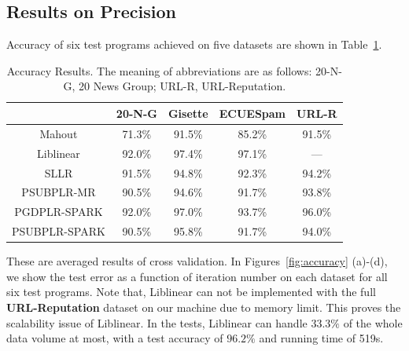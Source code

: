 \documentclass[10pt, conference, compsocconf]{IEEEtran}
\begin{document}
\subsection{Results on Precision} \label{sec:precision}
Accuracy of six test programs achieved on five datasets are shown in Table~\ref{tab:table3}.
%
\begin{table}[h]
\centering
\caption{Accuracy Results. The meaning of abbreviations are as follows: 20-N-G, 20 News Group; URL-R, URL-Reputation.}\label{tab:table3}\vspace{-0.3cm}
\begin{tabular}{|c|c|c|c|c|}
\hline
           & 20-N-G & Gisette & ECUESpam & URL-R \\
\hline
Mahout     & 71.3\% & 91.5\% & 85.2\% & 91.5\% \\
\hline
Liblinear  & 92.0\% & 97.4\% & 97.1\% & --- \\
\hline
SLLR       & 91.5\% & 94.8\% & 92.3\% & 94.2\% \\
\hline
PSUBPLR-MR & 90.5\% & 94.6\% & 91.7\% & 93.8\% \\
\hline
PGDPLR-SPARK & 92.0\% & 97.0\% & 93.7\% & 96.0\% \\
\hline
PSUBPLR-SPARK & 90.5\% & 95.8\% & 91.7\% & 94.0\% \\
\hline
\end{tabular}
\end{table}
%
These are averaged results of cross validation.
In Figures~\ref{fig:accuracy} (a)-(d), we show the test error as a function of iteration number on each dataset for all six test programs.
Note that, Liblinear can not be implemented with the full \textbf{URL-Reputation} dataset on our machine due to memory limit.
This proves the scalability issue of Liblinear.
In the tests, Liblinear can handle $33.3\%$ of the whole data volume at most, with a test accuracy of $96.2\%$ and running time of 519s.
%
\end{document}
